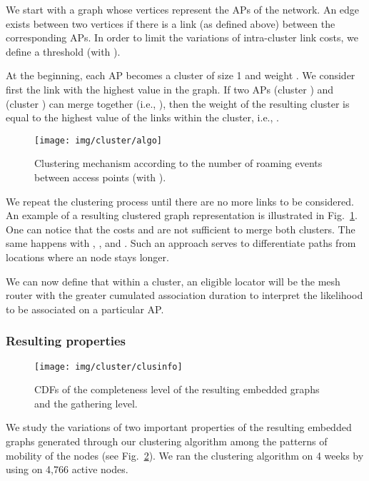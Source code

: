 \documentclass[a4paper]{sig-alternate-10pt}
\begin{document}
We start with a graph whose vertices represent the APs of the
network. An edge exists between two vertices if there is a link (as
defined above) between the corresponding APs. In order to limit the
variations of intra-cluster link costs, we define a threshold 
(with ).

At the beginning, each AP  becomes a cluster  of size 1 and
weight . We consider first the link with the highest value in
the graph. If two APs  (cluster ) and  (cluster )
can merge together (i.e., ),
then the weight of the resulting cluster is equal to the highest
value of the links within the cluster, i.e., .

\begin{figure}[t!]
\begin{center}
\texttt{[image: img/cluster/algo]}
\caption{Clustering mechanism according to the number of roaming
events between access points (with ).} \label{fig:clusters}
\end{center}
\end{figure}

We repeat the clustering process until there are no more links to be
considered. An example of a resulting clustered graph representation
is illustrated in Fig.~\ref{fig:clusters}. One can notice that the
costs  and  are not sufficient to merge both
clusters. The same happens with , , and .
Such an approach serves to differentiate paths from locations where
an node stays longer.

We can now define that within a cluster, an eligible locator will 
be the mesh router with the greater cumulated association duration to 
interpret the likelihood to be associated on a particular AP. 

\subsubsection{Resulting properties}

\begin{figure}
\texttt{[image: img/cluster/clusinfo]}
\caption{CDFs of the completeness level of the resulting embedded
graphs and the gathering level.} \label{fig_clus_properties}
\end{figure}

We study the variations of two important properties of the resulting
embedded graphs generated through our clustering algorithm among the
patterns of mobility of the nodes (see
Fig.~\ref{fig_clus_properties}). We ran the clustering algorithm on
4 weeks by using  on 4,766 active nodes.\vspace{2mm}
\end{document}
